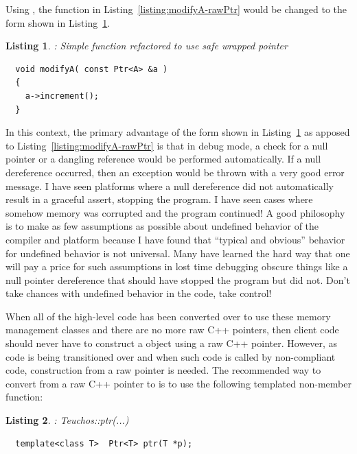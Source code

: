 \documentclass[pdf,ps2pdf,11pt]{SANDreport}
\newtheorem{listing}{Listing}
\begin{document}
Using {}, the function {} in
Listing~\ref{listing:modifyA-rawPtr} would be changed to the form
shown in Listing~\ref{listing:modifyA-Ptr}.

{}\begin{listing}: Simple function refactored to use safe {} wrapped
pointer
\label{listing:modifyA-Ptr}
{\small\begin{verbatim}
  void modifyA( const Ptr<A> &a )
  {
    a->increment();
  }
\end{verbatim}}
\end{listing}

In this context, the primary advantage of the form shown in
Listing~\ref{listing:modifyA-Ptr} as apposed to
Listing~\ref{listing:modifyA-rawPtr} is that in debug mode, a check
for a null pointer or a dangling reference would be performed
automatically.  If a null dereference occurred, then an exception
would be thrown with a very good error message.  I have seen platforms
where a null dereference did not automatically result in a graceful
assert, stopping the program.  I have seen cases where somehow memory
was corrupted and the program continued!  A good philosophy is to make
as few assumptions as possible about undefined behavior of the
compiler and platform because I have found that ``typical and
obvious'' behavior for undefined behavior is not universal.  Many have
learned the hard way that one will pay a price for such assumptions in
lost time debugging obscure things like a null pointer dereference
that should have stopped the program but did not.  Don't take chances
with undefined behavior in the code, take control!

When all of the high-level code has been converted over to use these
memory management classes and there are no more raw C++ pointers, then
client code should never have to construct a {} object using
a raw C++ pointer.  However, as code is being transitioned over and
when such code is called by non-compliant code, construction from a
raw pointer is needed.  The recommended way to convert from a raw C++
pointer to {} is to use the following templated non-member
function:

\begin{listing}: Teuchos::ptr(...)\\
\label{listing:ptr}
{\small\begin{verbatim}
  template<class T>  Ptr<T> ptr(T *p);
\end{verbatim}}
\end{listing}
\end{document}
